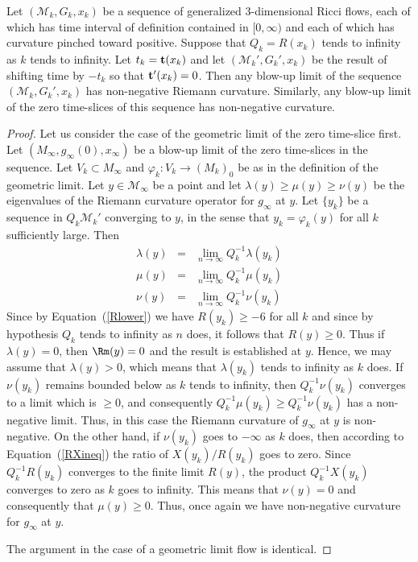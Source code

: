 \begin{theorem}\label{thm:blow-up-limit-nonnegative-curvature}
\label{blowupposcurv}

Let $({\mathcal M}_k,G_k,x_k)$ be a sequence of generalized $3$-dimensional
Ricci flows, each of which has time interval of definition contained in
$[0,\infty)$ and each of which has curvature pinched toward positive. Suppose
that $Q_k=R(x_k)$ tends to infinity as $k$ tends to infinity. Let $t_k={\bf
t}(x_k)$ and let $({\mathcal M}_k',G_k',x_k)$ be the result of shifting time by
$-t_k$ so that ${\bf t}'(x_k)=0$. Then any blow-up limit of the sequence
$({\mathcal M}_k,G_k',x_k)$ has non-negative Riemann curvature. Similarly, any
blow-up limit of the zero time-slices of this sequence has non-negative
curvature.
\end{theorem}

\begin{proof}
\sketch
{}
Let us consider the case of the geometric limit of the zero time-slice first.
Let $( M_\infty,g_\infty(0),x_\infty)$ be a blow-up limit of the zero
time-slices in the sequence. Let $V_k\subset M_\infty$ and $\varphi_k\colon
V_k\to (M_k)_0$ be as in the definition of the geometric limit. Let $y\in
{\mathcal M}_\infty$ be a point and let $\lambda(y)\ge \mu(y)\ge \nu(y)$ be the
eigenvalues of the Riemann curvature operator for $g_\infty$ at $y$. Let
$\{y_k\}$ be a sequence in $Q_k{\mathcal M}_k'$ converging to $y$, in the sense
that $y_k=\varphi_k(y)$ for all $k$ sufficiently large. Then
\begin{eqnarray*}
\lambda(y) & = & \lim_{n\rightarrow\infty}Q_k^{-1}\lambda(y_k) \\
\mu(y) & = & \lim_{n\rightarrow\infty}Q_k^{-1}\mu(y_k) \\
\nu(y) & = & \lim_{n\rightarrow\infty}Q_k^{-1}\nu(y_k)
\end{eqnarray*}
Since by Equation~(\ref{Rlower}) we have $R(y_k)\ge -6$ for all $k$ and since
by hypothesis $Q_k$ tends to infinity as $n$ does, it follows that $R(y)\ge 0$.
Thus if $\lambda(y)=0$, then $\Rm(y)=0$ and the result is established at
$y$. Hence, we may assume that $\lambda(y)>0$, which means that $\lambda(y_k)$
tends to infinity as $k$ does. If $\nu(y_k)$ remains bounded below as $k$ tends
to infinity, then $Q_k^{-1}\nu(y_k)$ converges to a limit which is $\ge 0$, and
consequently $Q_k^{-1}\mu(y_k)\ge Q_k^{-1}\nu(y_k)$ has a non-negative limit.
Thus, in this case the Riemann curvature of $g_\infty$ at $y$ is non-negative.
On the other hand, if $\nu(y_k)$ goes to $-\infty$ as $k$ does, then according
to Equation~(\ref{RXineq}) the ratio of $X(y_k)/R(y_k)$ goes to zero. Since
$Q_k^{-1}R(y_k)$ converges to the finite limit $R(y)$, the product
$Q_k^{-1}X(y_k)$ converges to zero as $k$ goes to infinity. This means that
$\nu(y)=0$ and consequently that $\mu(y)\ge 0$. Thus, once again we have
non-negative curvature for $g_\infty$ at $y$.

The argument in the case of a geometric limit flow is identical.
\end{proof}

